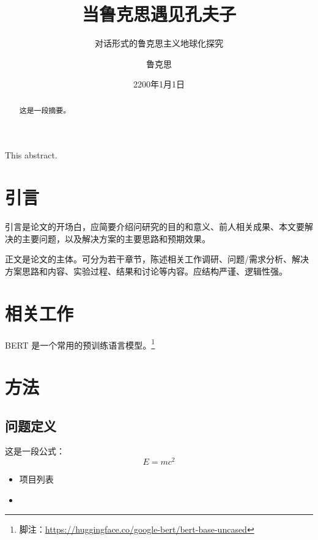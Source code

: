 \documentclass[12pt,punct=kaiming]{ctexart}
\title{当鲁克思遇见孔夫子}
\subtitle{对话形式的鲁克思主义地球化探究}
\author{鲁克思}
\date{2200年1月1日}
\begin{document}
\maketitle


\newpage
\begin{abstract}
这是一段摘要。
\end{abstract}

\begin{enabstract}
This abstract.
\end{enabstract}
\newpage

\tableofcontents
\newpage

\makedoc

\section{引言}

引言是论文的开场白，应简要介绍问研究的目的和意义、前人相关成果、本文要解决的主要问题，以及解决方案的主要思路和预期效果。

正文是论文的主体。可分为若干章节，陈述相关工作调研、问题/需求分析、解决方案思路和内容、实验过程、结果和讨论等内容。应结构严谨、逻辑性强。

\section{相关工作}

BERT 是一个常用的预训练语言模型\cite{devlin2018bert}。\footnote{脚注：\url{https://huggingface.co/google-bert/bert-base-uncased}}

\section{方法}

\subsection{问题定义}

这是一段公式：
\begin{equation}
    E = mc^2
\end{equation}

\begin{itemize}
    \item 项目列表
    \item
\end{itemize}
\end{document}
